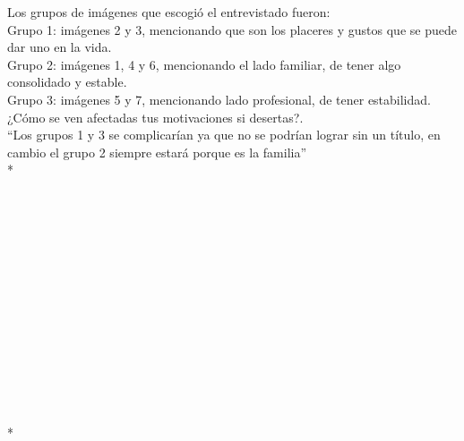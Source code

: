 Los grupos de imágenes que escogió el entrevistado fueron:\\

Grupo 1: imágenes 2 y 3, mencionando que son los placeres y gustos que se puede dar uno en la vida.\\

Grupo 2: imágenes 1, 4 y 6, mencionando el lado familiar, de tener algo consolidado y estable.\\

Grupo 3: imágenes 5 y 7, mencionando lado profesional, de tener estabilidad.\\

¿Cómo se ven afectadas tus motivaciones si desertas?.\\
``Los grupos 1 y 3 se complicarían ya que no se podrían lograr sin un título, en cambio el grupo 2 siempre estará porque es la familia''\\* 
\\
\\
\\
\\
\\
\\
\\
\\
\\
\\
\\
\\
\\
\\
\\*

